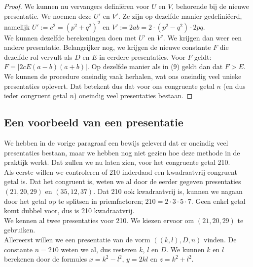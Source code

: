 \documentclass[12pt,reqno]{article}
\theoremstyle{theorem}
\theoremstyle{definition}
\begin{document}
\begin{proof}
		We kunnen nu vervangers defini\"eren voor $U$ en $V$, behorende bij de nieuwe presentatie. We noemen deze $U'$ en $V'$. Ze zijn op dezelfde manier gedefini\"eerd, namelijk $U':=c^2=(p^2+q^2)^2$ en $V':=2ab=2\cdot(p^2-q^2)\cdot2pq$.\\
		
		We kunnen dezelfde berekeningen doen met $U'$ en $V'$. We krijgen dan weer een andere presentatie. Belangrijker nog, we krijgen de nieuwe constante $F$ die dezelfde rol vervult als $D$ en $E$ in eerdere presentaties. Voor $F$ geldt: $F=|2 c E (a-b) (a+b)|.$ Op dezelfde manier als in (9) geldt dan dat $F>E$.\\
		
		We kunnen de procedure oneindig vaak herhalen, wat ons oneindig veel unieke presentaties oplevert. Dat betekent dus dat voor ons congruente getal $n$ (en dus ieder congruent getal $n$) oneindig veel presentaties bestaan.
	\end{proof}
	
	\subsection{Een voorbeeld van een presentatie}
	We hebben in de vorige paragraaf een bewijs geleverd dat er oneindig veel presentaties bestaan, maar we hebben nog niet gezien hoe deze methode in de praktijk werkt. Dat zullen we nu laten zien, voor het congruente getal 210.\\
	
	Als eerste willen we controleren of 210 inderdaad een kwadraatvrij congruent getal is. Dat het congruent is, weten we al door de eerder gegeven presentaties $(21,20,29)$ en $(35,12,37)$. Dat 210 ook kwadraatvrij is, kunnen we nagaan door het getal op te splitsen in priemfactoren; $210 = 2 \cdot 3 \cdot 5 \cdot 7$. Geen enkel getal komt dubbel voor, dus is 210 kwadraatvrij.\\
	
	We kennen al twee presentaties voor 210. We kiezen ervoor om $(21,20,29)$ te gebruiken.\\
	
	Allereerst willen we een presentatie van de vorm $((k,l),D,n)$ vinden. De constante $n=210$ weten we al, dus resteren $k$, $l$ en $D$. We kunnen $k$ en $l$ berekenen door de formules $x = k^2 - l^2$, $y = 2kl$ en $z = k^2 + l^2$.\\
	
\end{document}
